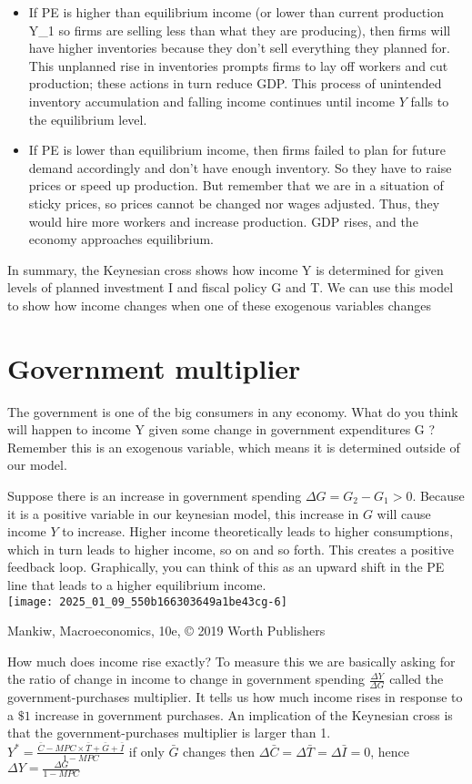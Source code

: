 \documentclass[10pt]{article}
\begin{document}
\begin{itemize}
  \item If PE is higher than equilibrium income (or lower than current production Y\_1 so firms are selling less than what they are producing), then firms will have higher inventories because they don't sell everything they planned for. This unplanned rise in inventories prompts firms to lay off workers and cut production; these actions in turn reduce GDP. This process of unintended inventory accumulation and falling income continues until income $Y$ falls to the equilibrium level.
  \item If PE is lower than equilibrium income, then firms failed to plan for future demand accordingly and don't have enough inventory. So they have to raise prices or speed up production. But remember that we are in a situation of sticky prices, so prices cannot be changed nor wages adjusted. Thus, they would hire more workers and increase production. GDP rises, and the economy approaches equilibrium.
\end{itemize}

In summary, the Keynesian cross shows how income Y is determined for given levels of planned investment I and fiscal policy G and T. We can use this model to show how income changes when one of these exogenous variables changes

\section*{Government multiplier}
The government is one of the big consumers in any economy. What do you think will happen to income Y given some change in government expenditures G ? Remember this is an exogenous variable, which means it is determined outside of our model.

Suppose there is an increase in government spending $\Delta G=G_{2}-G_{1}>0$. Because it is a positive variable in our keynesian model, this increase in $G$ will cause income $Y$ to increase. Higher income theoretically leads to higher consumptions, which in turn leads to higher income, so on and so forth. This creates a positive feedback loop. Graphically, you can think of this as an upward shift in the PE line that leads to a higher equilibrium income.\\
\texttt{[image: 2025\_01\_09\_550b166303649a1be43cg-6]}

Mankiw, Macroeconomics, 10e, © 2019 Worth Publishers

How much does income rise exactly? To measure this we are basically asking for the ratio of change in income to change in government spending $\frac{\Delta Y}{\Delta G}$ called the government-purchases multiplier. It tells us how much income rises in response to a $\$ 1$ increase in government purchases. An implication of the Keynesian cross is that the government-purchases multiplier is larger than 1.\\
$Y^{*}=\frac{\bar{C}-M P C \times \bar{T}+\bar{G}+\bar{I}}{1-M P C}$ if only $\bar{G}$ changes then $\Delta \bar{C}=\Delta \bar{T}=\Delta \bar{I}=0$, hence $\Delta Y=\frac{\Delta G}{1-M P C}$
\end{document}
